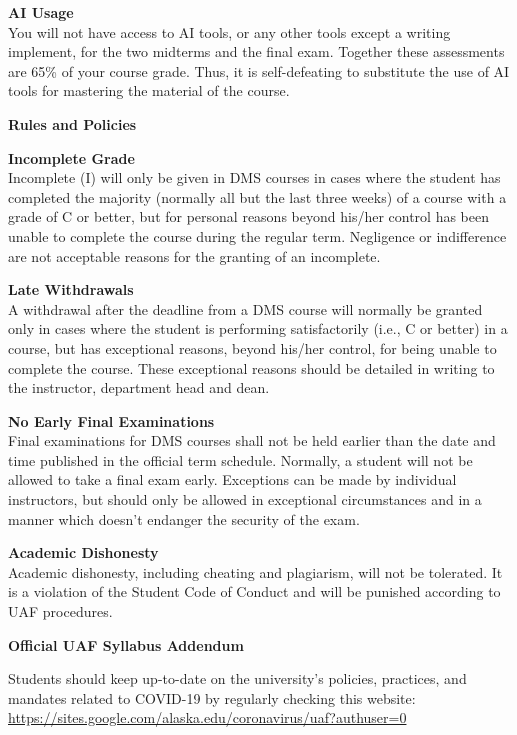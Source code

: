 \documentclass[12pt]{article}
\renewcommand{\emph}[1]{\textsf{\textbf{#1}}}
\newcommand{\localhead}[1]{\par\smallskip\textbf{#1} \smallskip\nobreak\\}%
\def\heading#1{\localhead{\large\emph{#1}}}
\def\subheading#1{\localhead{\emph{#1}}}
\begin{document}
\heading{AI Usage}
You will not have access to AI tools, or any other tools except a writing implement, for the two midterms and the final exam. Together these assessments are 65\% of your course grade. Thus, it is self-defeating to substitute the use of AI tools for mastering the material of the course.

\heading{Rules and Policies}
\vskip -20pt
\subheading{Incomplete Grade} 
Incomplete (I) will only be given in
  DMS courses in cases where
  the student has completed the majority (normally all but the last
  three weeks) of a course with a grade of C or better, but for
  personal reasons beyond his/her control has been unable to complete
  the course during the regular term. Negligence or indifference are
  not acceptable reasons for the granting of an incomplete. 

\subheading{Late Withdrawals} 
A withdrawal after the deadline from a DMS course will
  normally be granted only in cases where the student is performing
  satisfactorily (i.e., C or better) in a course, but has exceptional
  reasons, beyond his/her control, for being unable to complete the
  course. These exceptional reasons should be detailed in writing to
  the instructor, department head and dean.

\subheading{No Early Final Examinations}
Final examinations for DMS
  courses shall not be held earlier than the date and time published
  in the official term schedule. Normally, a student will not be
  allowed to take a final exam early. Exceptions can be made by
  individual instructors, but should only be allowed in exceptional
  circumstances and in a manner which doesn't endanger the security of
  the exam.

\subheading{Academic Dishonesty}
Academic dishonesty, including cheating and plagiarism, will not
be tolerated.  It is a violation of the Student Code of Conduct
and will be punished according to UAF procedures.

\newpage

\begin{center}
\textbf{\large{Official UAF Syllabus Addendum}}
\end{center}

 Students should keep up-to-date on the university's policies, practices, and mandates related to COVID-19 by regularly checking this website: \url{https://sites.google.com/alaska.edu/coronavirus/uaf?authuser=0}
\end{document}
